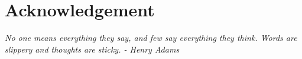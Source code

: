 %
%
\chapter*{Acknowledgement}
\thispagestyle{empty}

\lipsum[1]

\vspace{0.5cm}

\begin{displayquote}
\textit{No one means everything they say, and few say everything they think. Words are slippery and thoughts are sticky. - Henry Adams}
\end{displayquote}

\newpage